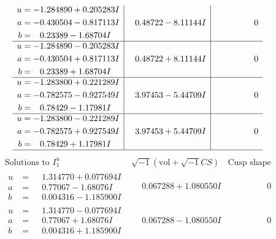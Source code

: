 \documentclass[1p]{elsarticle_modified}
\theoremstyle{definition}
\newcommand{\I}{\sqrt{-1}}
\begin{document}
$$\begin{array}{c|c|c}
\begin{aligned}
u &= -1.284890 + 0.205283 I \\
a &= -0.430504 - 0.817113 I \\
b &= \phantom{-}0.23389 - 1.68704 I\end{aligned}
 & \phantom{-}0.48722 - 8.11144 I & \phantom{-0.000000 } 0 \\ \hline\begin{aligned}
u &= -1.284890 - 0.205283 I \\
a &= -0.430504 + 0.817113 I \\
b &= \phantom{-}0.23389 + 1.68704 I\end{aligned}
 & \phantom{-}0.48722 + 8.11144 I & \phantom{-0.000000 } 0 \\ \hline\begin{aligned}
u &= -1.283800 + 0.221289 I \\
a &= -0.782575 - 0.927549 I \\
b &= \phantom{-}0.78429 - 1.17981 I\end{aligned}
 & \phantom{-}3.97453 - 5.44709 I & \phantom{-0.000000 } 0 \\ \hline\begin{aligned}
u &= -1.283800 - 0.221289 I \\
a &= -0.782575 + 0.927549 I \\
b &= \phantom{-}0.78429 + 1.17981 I\end{aligned}
 & \phantom{-}3.97453 + 5.44709 I & \phantom{-0.000000 } 0\\
 \hline 
 \end{array}$$\newpage$$\begin{array}{c|c|c}  
\text{Solutions to }I^u_{1}& \I (\text{vol} + \sqrt{-1}CS) & \text{Cusp shape}\\
 \hline 
\begin{aligned}
u &= \phantom{-}1.314770 + 0.077694 I \\
a &= \phantom{-}0.77067 - 1.68076 I \\
b &= \phantom{-}0.004316 - 1.185900 I\end{aligned}
 & \phantom{-}0.067288 + 1.080550 I & \phantom{-0.000000 } 0 \\ \hline\begin{aligned}
u &= \phantom{-}1.314770 - 0.077694 I \\
a &= \phantom{-}0.77067 + 1.68076 I \\
b &= \phantom{-}0.004316 + 1.185900 I\end{aligned}
 & \phantom{-}0.067288 - 1.080550 I & \phantom{-0.000000 } 0 \\ \hline\begin{aligned}

\end{aligned}
\end{array}$$
\end{document}
